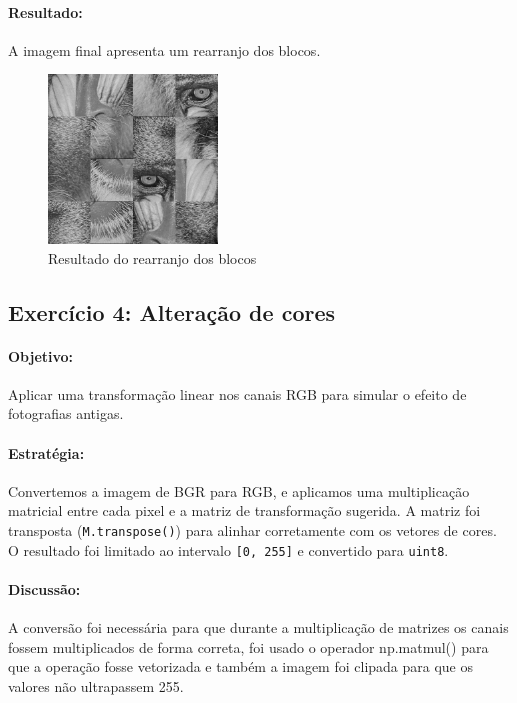\documentclass[12pt,a4paper]{report}
\begin{document}
\paragraph{Resultado:} 
A imagem final apresenta um rearranjo dos blocos.
\begin{figure}[H]
  \centering
  \includegraphics[width=0.4\textwidth]{imagens/ex3.png}
  \caption{Resultado do rearranjo dos blocos}
\end{figure}

\subsection{Exercício 4: Alteração de cores}
\paragraph{Objetivo:} 
Aplicar uma transformação linear nos canais RGB para simular o efeito de fotografias antigas.

\paragraph{Estratégia:} 
Convertemos a imagem de BGR para RGB, e aplicamos uma multiplicação matricial entre cada pixel e a matriz de transformação sugerida. A matriz foi transposta (\texttt{M.transpose()}) para alinhar corretamente com os vetores de cores. O resultado foi limitado ao intervalo \texttt{[0, 255]} e convertido para \texttt{uint8}.

\paragraph{Discussão:} 
A conversão foi necessária para que durante a multiplicação de matrizes os canais fossem multiplicados de forma correta, foi usado o operador np.matmul() para que a operação fosse vetorizada e também a imagem foi clipada para que os valores não ultrapassem 255.
\end{document}
